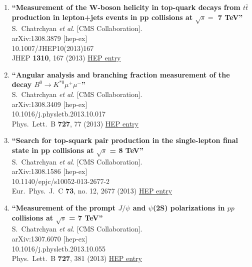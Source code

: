 \documentclass{article}
\begin{document}
\begin{enumerate}
\item%
{\bf ``Measurement of the W-boson helicity in top-quark decays from $t\bar{t}$ production in lepton+jets events in pp collisions at $\sqrt{s} =$ 7 TeV''}
  \\{}S.~Chatrchyan {\it et al.} [CMS Collaboration].
  \\{}arXiv:1308.3879 [hep-ex]
    \\{}10.1007/JHEP10(2013)167
\\{}JHEP {\bf 1310}, 167 (2013) %
\href{http://inspirehep.net/record/1249595}{HEP entry}


\item%
{\bf ``Angular analysis and branching fraction measurement of the decay $B^0 \to K^{*0} \mu^+\mu^-$''}
  \\{}S.~Chatrchyan {\it et al.} [CMS Collaboration].
  \\{}arXiv:1308.3409 [hep-ex]
    \\{}10.1016/j.physletb.2013.10.017
\\{}Phys.\ Lett.\ B {\bf 727}, 77 (2013) %
\href{http://inspirehep.net/record/1247976}{HEP entry}


\item%
{\bf ``Search for top-squark pair production in the single-lepton final state in pp collisions at $\sqrt{s}$ = 8 TeV''}
  \\{}S.~Chatrchyan {\it et al.} [CMS Collaboration].
  \\{}arXiv:1308.1586 [hep-ex]
    \\{}10.1140/epjc/s10052-013-2677-2
\\{}Eur.\ Phys.\ J.\ C {\bf 73}, no. 12, 2677 (2013) %
\href{http://inspirehep.net/record/1246905}{HEP entry}


\item%
{\bf ``Measurement of the prompt $J/\psi$ and $\psi$(2S) polarizations in $pp$ collisions at $\sqrt{s}$ = 7 TeV''}
  \\{}S.~Chatrchyan {\it et al.} [CMS Collaboration].
  \\{}arXiv:1307.6070 [hep-ex]
    \\{}10.1016/j.physletb.2013.10.055
\\{}Phys.\ Lett.\ B {\bf 727}, 381 (2013) %
\href{http://inspirehep.net/record/1244128}{HEP entry}



\end{enumerate}
\end{document}

